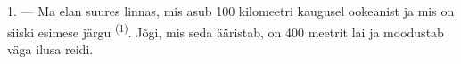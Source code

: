 %
%
%
%
%
%

\VUsaut{2.0mm}
\VUsaut{3.0mm}
\VUfilet{16mm}
\VUsaut{5.6mm}
\VUsaut{1.4mm}
\VUsaut{2.2mm}

\VUsaut{3.0mm}

1. --- Ma elan suures linnas, mis asub 100 kilomeetri kaugusel ookeanist ja mis on
siiski esimese järgu  \textsuperscript{(1)}. Jõgi, mis seda ääristab, on
400 meetrit lai ja moodustab väga ilusa reidi.

